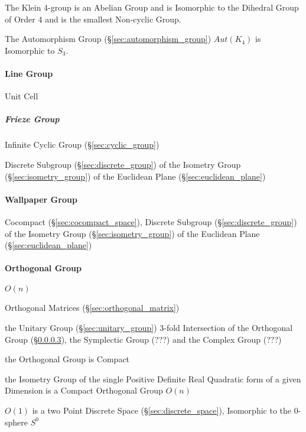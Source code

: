 The Klein 4-group is an Abelian Group and is Isomorphic to the
Dihedral Group of Order 4 and is the smallest Non-cyclic Group.

The Automorphism Group (\S\ref{sec:automorphism_group}) $Aut(K_4)$ is
Isomorphic to $S_3$.



\paragraph{Line Group}\label{sec:line_group}\hfill

Unit Cell



\subparagraph{Frieze Group}\label{sec:frieze_group}\hfill

Infinite Cyclic Group (\S\ref{sec:cyclic_group})

Discrete Subgroup (\S\ref{sec:discrete_group}) of the Isometry Group
(\S\ref{sec:isometry_group}) of the Euclidean Plane
(\S\ref{sec:euclidean_plane})



\paragraph{Wallpaper Group}\label{sec:wallpaper_group}\hfill

Cocompact (\S\ref{sec:cocompact_space}), Discrete Subgroup
(\S\ref{sec:discrete_group}) of the Isometry Group (\S\ref{sec:isometry_group})
of the Euclidean Plane (\S\ref{sec:euclidean_plane})



\paragraph{Orthogonal Group}\label{sec:orthogonal_group}\hfill

$O(n)$

Orthogonal Matrices (\S\ref{sec:orthogonal_matrix})

the Unitary Group (\S\ref{sec:unitary_group}) 3-fold Intersection of the
Orthogonal Group (\S\ref{sec:orthogonal_group}), the Symplectic Group (???) and
the Complex Group (???) %

the Orthogonal Group is Compact

the Isometry Group of the single Positive Definite Real Quadratic form of a
given Dimension is a Compact Orthogonal Group $O(n)$

$O(1)$ is a two Point Discrete Space (\S\ref{sec:discrete_space}), Isomorphic
to the $0$-sphere $S^0$

